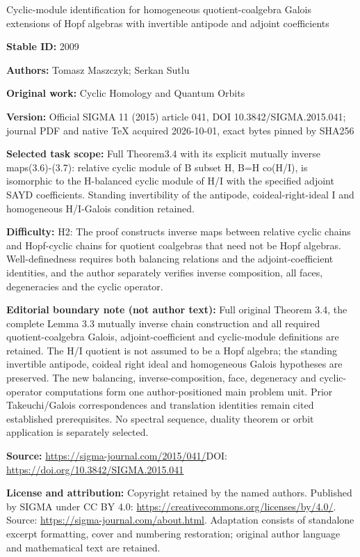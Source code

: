 \documentclass[11pt]{article}
\numberwithin{equation}{section}
\begin{document}
\begin{center}\Large Cyclic-module identification for homogeneous quotient-coalgebra Galois extensions of Hopf algebras with invertible antipode and adjoint coefficients\end{center}
\noindent\textbf{Stable ID:} 2009\par
\noindent\textbf{Authors:} Tomasz Maszczyk; Serkan Sutlu\par
\noindent\textbf{Original work:} Cyclic Homology and Quantum Orbits\par
\noindent\textbf{Version:} Official SIGMA 11 (2015) article 041, DOI 10.3842/SIGMA.2015.041; journal PDF and native TeX acquired 2026-10-01, exact bytes pinned by SHA256\par
\noindent\textbf{Selected task scope:} Full Theorem3.4 with its explicit mutually inverse maps(3.6)-(3.7): relative cyclic module of B subset H, B=\allowbreak{}H co(H/I), is isomorphic to the H-balanced cyclic module of H/I with the specified adjoint SAYD coefficients. Standing invertibility of the antipode, coideal-right-ideal I and homogeneous H/I-Galois condition retained.\par
\noindent\textbf{Difficulty:} H2: The proof constructs inverse maps between relative cyclic chains and Hopf-cyclic chains for quotient coalgebras that need not be Hopf algebras. Well-definedness requires both balancing relations and the adjoint-coefficient identities, and the author separately verifies inverse composition, all faces, degeneracies and the cyclic operator.\par
\noindent\textbf{Editorial boundary note (not author text):} Full original Theorem 3.4, the complete Lemma 3.3 mutually inverse chain construction and all required quotient-coalgebra Galois, adjoint-coefficient and cyclic-module definitions are retained. The H/I quotient is not assumed to be a Hopf algebra; the standing invertible antipode, coideal right ideal and homogeneous Galois hypotheses are preserved. The new balancing, inverse-composition, face, degeneracy and cyclic-operator computations form one author-positioned main problem unit. Prior Takeuchi/Galois correspondences and translation identities remain cited established prerequisites. No spectral sequence, duality theorem or orbit application is separately selected.\par
\noindent\textbf{Source:} \url{https://sigma-journal.com/2015/041/}\quad DOI: \url{https://doi.org/10.3842/SIGMA.2015.041}\par
\noindent\textbf{License and attribution:} Copyright retained by the named authors. Published by SIGMA under CC BY 4.0: \url{https://creativecommons.org/licenses/by/4.0/}. Source: \url{https://sigma-journal.com/about.html}. Adaptation consists of standalone excerpt formatting, cover and numbering restoration; original author language and mathematical text are retained.\par
\end{document}
